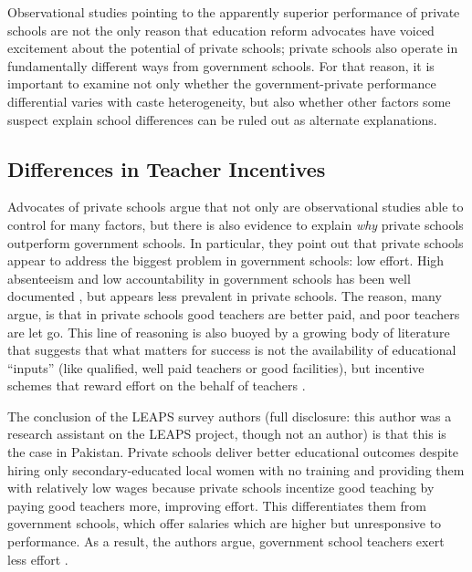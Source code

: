 \documentclass[Eubank_pk_ethnic_sorting.tex]{subfiles}
\begin{document}
Observational studies pointing to the apparently superior performance of private schools are not the only reason that education reform advocates have voiced excitement about the potential of private schools; private schools also operate in fundamentally different ways from government schools. For that reason, it is important to examine not only whether the government-private performance differential varies with caste heterogeneity, but also whether other factors some suspect explain school differences can be ruled out as alternate explanations.


\subsection{Differences in Teacher Incentives}\label{incentives}

Advocates of private schools argue that not only are observational studies able to control for many factors, but there is also evidence to explain \emph{why} private schools outperform government schools. In particular, they point out that private schools appear to address the biggest problem in government schools: low effort. High absenteeism and low accountability in government schools has been well documented \citep{Muralidharan:2008tb, Chaudhury:2006vp}, but appears less prevalent in private schools. The reason, many argue, is that in private schools good teachers are better paid, and poor teachers are let go. This line of reasoning is also buoyed by a growing body of literature that suggests that what matters for success is not the availability of educational ``inputs'' (like qualified, well paid teachers or good facilities), but incentive schemes that reward effort on the behalf of teachers \citep{Hanushek:1997tt,Hanushek:2003hz,Banerjee:2007wx}.

The conclusion of the LEAPS survey authors (full disclosure: this author was a research assistant on the LEAPS project, though not an author) is that this is the case in Pakistan. Private schools deliver better educational outcomes despite hiring only secondary-educated local women with no training and providing them with relatively low wages because private schools incentize good teaching by paying good teachers more, improving effort. This differentiates them from government schools, which offer salaries which are higher but unresponsive to performance. As a result, the authors argue, government school teachers exert less effort \citep[p. 72-74]{Andrabi:2007we}. 
\end{document}
